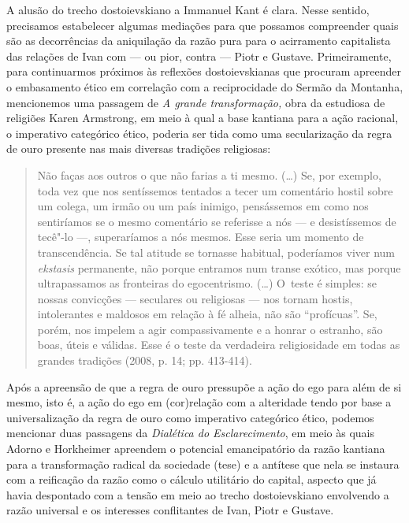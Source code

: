 A alusão do trecho dostoievskiano a Immanuel Kant é clara. Nesse
sentido, precisamos estabelecer algumas mediações para que possamos
compreender quais são as decorrências da aniquilação da razão pura para
o acirramento capitalista das relações de Ivan com --- ou pior, contra ---
Piotr e Gustave. Primeiramente, para continuarmos próximos às reflexões
dostoievskianas que procuram apreender o embasamento ético em correlação
com a reciprocidade do Sermão da Montanha, mencionemos uma passagem de
\emph{A grande transformação,} obra da estudiosa de religiões Karen
Armstrong, em meio à qual a base kantiana para a ação racional, o
imperativo categórico ético, poderia ser tida como uma secularização da
regra de ouro presente nas mais diversas tradições religiosas:

\begin{quote}
Não faças aos outros o que não farias a ti mesmo. (\ldots) Se, por exemplo,
toda vez que nos sentíssemos tentados a tecer um comentário hostil sobre
um colega, um irmão ou um país inimigo, pensássemos em como nos
sentiríamos se o mesmo comentário se referisse a nós --- e desistíssemos
de tecê"-lo ---, superaríamos a nós mesmos. Esse seria um momento de
transcendência. Se tal atitude se tornasse habitual, poderíamos viver
num \emph{ekstasis} permanente, não porque entramos num transe exótico,
mas porque ultrapassamos as fronteiras do egocentrismo. (\ldots) O~teste é
simples: se nossas convicções --- seculares ou religiosas --- nos tornam
hostis, intolerantes e maldosos em relação à fé alheia, não são
``profícuas''. Se, porém, nos impelem a agir compassivamente e a honrar
o estranho, são boas, úteis e válidas. Esse é o teste da verdadeira
religiosidade em todas as grandes tradições (2008, p. 14; pp. 413-414).
\end{quote}

Após a apreensão de que a regra de ouro pressupõe a ação do ego para
além de si mesmo, isto é, a ação do ego em (cor)relação com a alteridade
tendo por base a universalização da regra de ouro como imperativo
categórico ético, podemos mencionar duas passagens da \emph{Dialética do
Esclarecimento}, em meio às quais Adorno e Horkheimer apreendem o
potencial emancipatório da razão kantiana para a transformação radical
da sociedade (tese) e a antítese que nela se instaura com a reificação
da razão como o cálculo utilitário do capital, aspecto que já havia
despontado com a tensão em meio ao trecho dostoievskiano envolvendo a
razão universal e os interesses conflitantes de Ivan, Piotr e Gustave.

